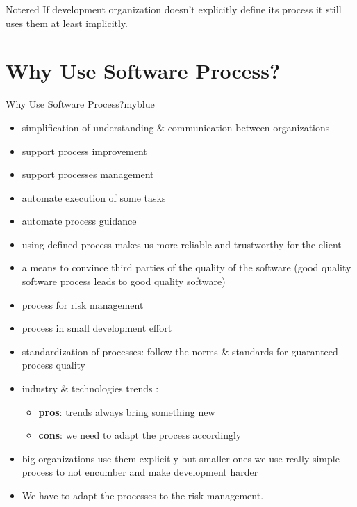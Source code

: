 \documentclass{report}
\begin{document}
\vspace{0.1cm}
\begin{prettyBox}{Note}{red}
    If development organization doesn't explicitly define its process it still uses them at least implicitly.
\end{prettyBox}

\vspace{0.25cm}
\section{Why Use Software Process?}
\begin{prettyBox}{Why Use Software Process?}{myblue}
    \begin{itemize}
        \itemsep0em 
        \item simplification of understanding \& communication between organizations
        \item support process improvement
        \item support processes management
        \item automate execution of some tasks
        \item automate process guidance
        \item using defined process makes us more reliable and trustworthy for the client
        \item a means to convince third parties of the quality of the software (good quality software process leads to good quality software)
        \item process for risk management
        \item process in small development effort
        \item standardization of processes: follow the norms \& standards for guaranteed process quality
        \item industry \& technologies trends :
            \begin{itemize}
                \itemsep0em 
                \item \textbf{pros}: trends always bring something new 
                \item \textbf{cons}: we need to adapt the process accordingly
            \end{itemize}
        \item big organizations use them explicitly but smaller ones we use really simple process to not encumber and make development harder
        \item We have to adapt the processes to the risk management.
    \end{itemize}
\end{prettyBox}
\end{document}
